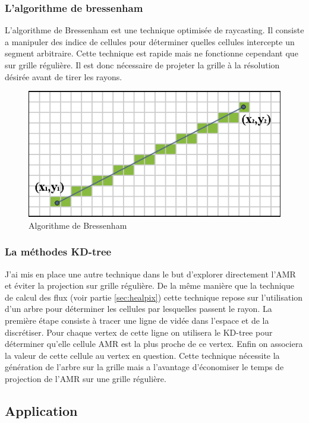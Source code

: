 \subsubsection{L'algorithme de bressenham}
L'algorithme de Bressenham est une technique optimisée de raycasting.
Il consiste a manipuler des indice de cellules pour déterminer quelles cellules intercepte un segment arbitraire.
Cette technique est rapide mais ne fonctionne cependant que sur grille régulière.
Il est donc nécessaire de projeter la grille à la résolution désirée avant de tirer les rayons.

\begin{figure}[bth]
        \includegraphics[width=.95\linewidth]{img/04/Bresenham_line.png} 
        \caption{Algorithme de Bressenham }
 		\label{fig:bressenham}
\end{figure}

\subsubsection{La méthodes KD-tree}

J'ai mis en place une autre technique dans le but d'explorer directement l'\ac{AMR} et éviter la projection sur grille régulière.
De la même manière que la technique de calcul des flux (voir partie \ref{sec:healpix}) cette technique repose sur l'utilisation d'un arbre pour déterminer les cellules par lesquelles passent le rayon.
La première étape consiste à tracer une ligne de vidée dans l'espace et de la discrétiser.
Pour chaque vertex de cette ligne on utilisera le KD-tree pour déterminer qu'elle cellule \ac{AMR} est la plus proche de ce vertex.
Enfin on associera la valeur de cette cellule au vertex en question.
Cette technique nécessite la génération de l'arbre sur la grille mais a l'avantage d'économiser le temps de projection de l'\ac{AMR} sur une grille régulière.


\subsection{Application}

